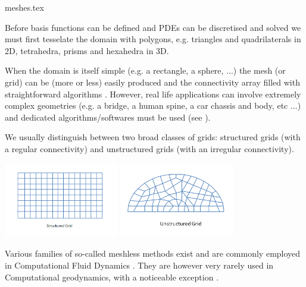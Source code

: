 \begin{flushright} {\tiny {\color{gray} meshes.tex}} \end{flushright}

Before basis functions can be defined and PDEs can be discretised and solved 
we must first tesselate the domain with polygons, e.g. triangles and 
quadrilaterals in 2D, tetrahedra, prisms and hexahedra in 3D.  

When the domain is itself simple (e.g. a rectangle, a sphere, ...) the mesh (or grid) can 
be (more or less) easily produced and the connectivity array filled with straightforward 
algorithms \cite{thie18}.
However, real life applications can involve extremely complex geometries (e.g. a bridge, 
a human spine, a car chassis and body, etc ...) and dedicated algorithms/softwares 
must be used (see \cite{thsw,frge,xiyz09}). 

We usually distinguish between two broad classes of grids: structured grids (with a regular 
connectivity) and unstructured grids (with an irregular connectivity).
 

\begin{center}
\includegraphics[width=5cm]{images/meshes/structured_grid}
\includegraphics[width=5cm]{images/meshes/unstructured_grid}
\end{center}

\begin{remark}
Various families of so-called meshless methods exist and are commonly employed in Computational 
Fluid Dynamics \cite{liugu,liliu,grliu,liuliu}. They are however very rarely used in 
Computational geodynamics, with a noticeable exception \cite{hans03}.
\end{remark}

